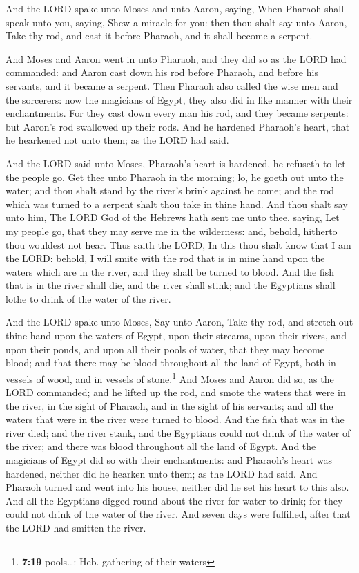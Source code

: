  And the LORD spake unto Moses and unto Aaron, saying,
 When Pharaoh shall speak unto you, saying, Shew a miracle
for you: then thou shalt say unto Aaron, Take thy rod, and cast it
before Pharaoh, and it shall become a serpent.

 And Moses and Aaron went in unto Pharaoh, and they did
so as the LORD had commanded: and Aaron cast down his rod before
Pharaoh, and before his servants, and it became a serpent.
 Then Pharaoh also called the wise men and the sorcerers:
now the magicians of Egypt, they also did in like manner with their
enchantments.  For they cast down every man his rod, and
they became serpents: but Aaron's rod swallowed up their rods.
 And he hardened Pharaoh's heart, that he hearkened not
unto them; as the LORD had said.

 And the LORD said unto Moses, Pharaoh's heart is
hardened, he refuseth to let the people go.  Get thee
unto Pharaoh in the morning; lo, he goeth out unto the water; and thou
shalt stand by the river's brink against he come; and the rod which was
turned to a serpent shalt thou take in thine hand.  And
thou shalt say unto him, The LORD God of the Hebrews hath sent me unto
thee, saying, Let my people go, that they may serve me in the
wilderness: and, behold, hitherto thou wouldest not hear.
 Thus saith the LORD, In this thou shalt know that I am
the LORD: behold, I will smite with the rod that is in mine hand upon
the waters which are in the river, and they shall be turned to blood.
 And the fish that is in the river shall die, and the
river shall stink; and the Egyptians shall lothe to drink of the water
of the river.

 And the LORD spake unto Moses, Say unto Aaron, Take thy
rod, and stretch out thine hand upon the waters of Egypt, upon their
streams, upon their rivers, and upon their ponds, and upon all their
pools of water, that they may become blood; and that there may be blood
throughout all the land of Egypt, both in vessels of wood, and in
vessels of stone.\footnote{\textbf{7:19} pools\ldots: Heb. gathering of
  their waters}  And Moses and Aaron did so, as the LORD
commanded; and he lifted up the rod, and smote the waters that were in
the river, in the sight of Pharaoh, and in the sight of his servants;
and all the waters that were in the river were turned to blood.
 And the fish that was in the river died; and the river
stank, and the Egyptians could not drink of the water of the river; and
there was blood throughout all the land of Egypt.  And
the magicians of Egypt did so with their enchantments: and Pharaoh's
heart was hardened, neither did he hearken unto them; as the LORD had
said.  And Pharaoh turned and went into his house,
neither did he set his heart to this also.  And all the
Egyptians digged round about the river for water to drink; for they
could not drink of the water of the river.  And seven
days were fulfilled, after that the LORD had smitten the river.

